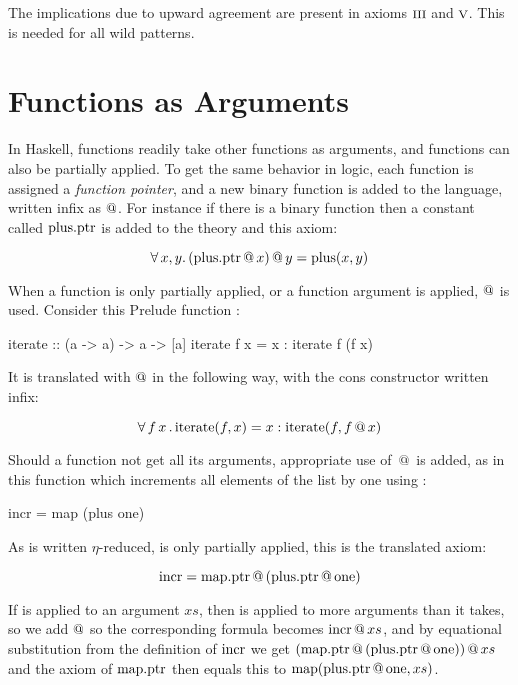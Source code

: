 The implications due to upward agreement are present in axioms
$\romnodot{3}$ and $\romnodot{5}$. This is needed for all wild
patterns.

\section{Functions as Arguments}

In Haskell, functions readily take other functions as arguments, and
functions can also be partially applied. To get the same behavior in
logic, each function is assigned a \emph{function pointer}, and a new
binary function is added to the language, written infix as $@$.
For instance if there is a binary function  then a constant
called $\mathrm{plus.ptr}$ is added to the theory and this axiom:

\begin{equation*}
\forall \, x , y . \,  (\mathrm{plus.ptr} \, @ \, x) \, @ \, y = \mathrm{plus}(x,y)
\end{equation*}

When a function is only partially applied, or a function argument is
applied, $@$ is used. Consider this Prelude function :

\begin{code}
iterate :: (a -> a) -> a -> [a]
iterate f x = x : iterate f (f x)
\end{code}

It is translated with $@$ in the following way, with the cons
constructor \hs{:} written infix:

\begin{equation*}
\forall \, f \, x \, . \, \mathrm{iterate}(f,x) = x : \mathrm{iterate}(f,f \, @ \, x)
\end{equation*}

Should a function not get all its arguments, appropriate use of $\, @ \, $ is
added, as in this function which increments all elements of the list
by one using :

\begin{code}
incr = map (plus one)
\end{code}

As  is written $\eta$-reduced,  is
only partially applied, this is the translated axiom:

\begin{equation*}
\mathrm{incr} = \mathrm{map.ptr} \, @ \, (\mathrm{plus.ptr} \, @ \, \mathrm{one})
\end{equation*}

If  is applied to an argument $xs$, then  is applied
to more arguments than it takes, so we add $@$ so the
corresponding formula becomes $\mathrm{incr} \, @ \, xs$, and by equational
substitution from the definition of $\mathrm{incr}$ we get
$(\mathrm{map.ptr} \, @ \, (\mathrm{plus.ptr} \, @ \, \mathrm{one})) \, @ \, xs$ and
the axiom of $\mathrm{map.ptr}$ then equals this to
$\mathrm{map}(\mathrm{plus.ptr} \, @ \, \mathrm{one},xs)$.

